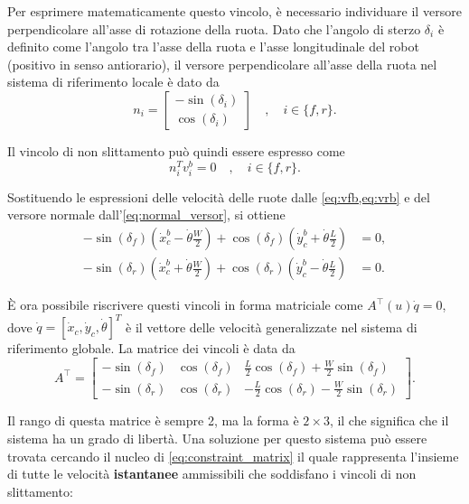 Per esprimere matematicamente questo vincolo, è necessario individuare il versore perpendicolare all'asse di rotazione della ruota. Dato che l'angolo di sterzo $\delta_i$ è definito come l'angolo tra l'asse della ruota e l'asse longitudinale del robot (positivo in senso antiorario), il versore perpendicolare all'asse della ruota nel sistema di riferimento locale è dato da
\begin{equation}\label{eq:normal_versor}
    n_i = \begin{bmatrix}
        -\sin(\delta_i) \\
        \cos(\delta_i)
    \end{bmatrix} \quad , \quad i \in \{f,r\}.
\end{equation}

Il vincolo di non slittamento può quindi essere espresso come
\begin{equation}\label{eq:nonslip_constraint}
    n_i^T v_i^b = 0 \quad , \quad i \in \{f,r\}.
\end{equation}

Sostituendo le espressioni delle velocità delle ruote dalle \cref{eq:vfb,eq:vrb} e del versore normale dall'\cref{eq:normal_versor}, si ottiene
\begin{align}
    -\sin(\delta_f)\left(\dot{x}_c^b - \dot{\theta} \frac{W}{2}\right) + \cos(\delta_f)\left(\dot{y}_c^b + \dot{\theta} \frac{L}{2}\right) & = 0, \label{eq:nonslip_f} \\
    -\sin(\delta_r)\left(\dot{x}_c^b + \dot{\theta} \frac{W}{2}\right) + \cos(\delta_r)\left(\dot{y}_c^b - \dot{\theta} \frac{L}{2}\right) & = 0. \label{eq:nonslip_r}
\end{align}

È ora possibile riscrivere questi vincoli in forma matriciale come $A^\top(u)\dot{q} = 0$, dove $\dot{q} = [\dot{x}_c, \dot{y}_c, \dot{\theta}]^T$ è il vettore delle velocità generalizzate nel sistema di riferimento globale. La matrice dei vincoli è data da
\begin{equation}\label{eq:constraint_matrix}
    A^\top = \begin{bmatrix}
        -\sin(\delta_f) & \cos(\delta_f) & \frac{L}{2}\cos(\delta_f) + \frac{W}{2}\sin(\delta_f)  \\
        -\sin(\delta_r) & \cos(\delta_r) & -\frac{L}{2}\cos(\delta_r) - \frac{W}{2}\sin(\delta_r)
    \end{bmatrix}.
\end{equation}

Il rango di questa matrice è sempre 2, ma la forma è $2 \times 3$, il che significa che il sistema ha un grado di libertà. Una soluzione per questo sistema può essere trovata cercando il nucleo di \cref{eq:constraint_matrix} il quale rappresenta l'insieme di tutte le velocità \textbf{istantanee} ammissibili che soddisfano i vincoli di non slittamento:

